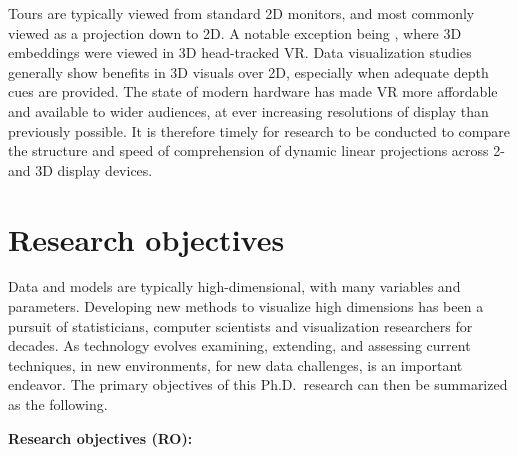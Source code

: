 \documentclass{monashthesis}
\begin{document}
Tours are typically viewed from standard 2D monitors, and most commonly viewed as a projection down to 2D. A notable exception being \textcite{nelson_xgobi_1998}, where 3D embeddings were viewed in 3D head-tracked VR. Data visualization studies generally show benefits in 3D visuals over 2D, especially when adequate depth cues are provided. The state of modern hardware has made VR more affordable and available to wider audiences, at ever increasing resolutions of display than previously possible. It is therefore timely for research to be conducted to compare the structure and speed of comprehension of dynamic linear projections across 2- and 3D display devices.

\hypertarget{research-objectives}{%
\section{Research objectives}\label{research-objectives}}

Data and models are typically high-dimensional, with many variables and parameters. Developing new methods to visualize high dimensions has been a pursuit of statisticians, computer scientists and visualization researchers for decades. As technology evolves examining, extending, and assessing current techniques, in new environments, for new data challenges, is an important endeavor. The primary objectives of this Ph.D.~research can then be summarized as the following.

\textbf{Research objectives (RO):}
\end{document}

